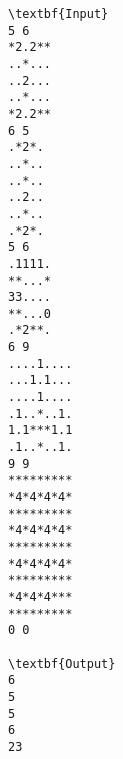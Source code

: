 \begin{verbatim}
\textbf{Input}
5 6
*2.2**
..*...
..2...
..*...
*2.2**
6 5
.*2*.
..*..
..*..
..2..
..*..
.*2*.
5 6
.1111.
**...*
33....
**...0
.*2**.
6 9
....1....
...1.1...
....1....
.1..*..1.
1.1***1.1
.1..*..1.
9 9
*********
*4*4*4*4*
*********
*4*4*4*4*
*********
*4*4*4*4*
*********
*4*4*4***
*********
0 0

\textbf{Output}
6
5
5
6
23\end{verbatim}